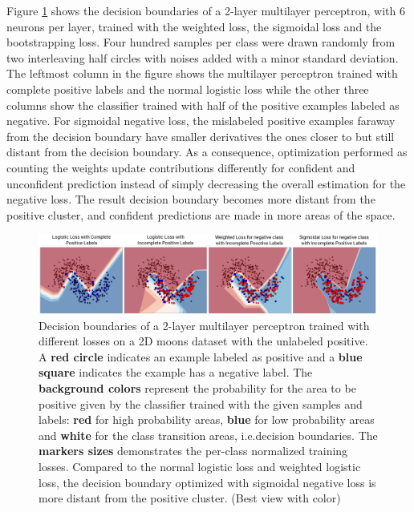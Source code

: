 Figure \ref{fig:moons} shows the decision boundaries of a 2-layer multilayer perceptron, with 6 neurons per layer, trained with the weighted loss, the sigmoidal loss and the bootstrapping loss.
Four hundred samples per class were drawn randomly from two interleaving half circles with noises added with a minor standard deviation.
The leftmost column in the figure shows the multilayer perceptron trained with complete positive labels and the normal logistic loss while the other three columns show the classifier trained with half of the positive examples labeled as negative.
For sigmoidal negative loss, the mislabeled positive examples faraway from the decision boundary have smaller derivatives the ones closer to but still distant from the decision boundary.
As a consequence, optimization performed as counting the weights update contributions differently for confident and unconfident prediction instead of simply decreasing the overall estimation for the negative loss.
The result decision boundary becomes more distant from the positive cluster, and confident predictions are made in more areas of the space.


\begin{figure}
\begin{center}
   \includegraphics[width=0.95\linewidth]{img/moons}
\end{center}
   \caption{
   Decision boundaries of a 2-layer multilayer perceptron trained with different losses on a 2D moons dataset with the unlabeled positive.
   A \textbf{red circle} indicates an example labeled as positive and a \textbf{blue square} indicates the example has a negative label.
   The \textbf{background colors} represent the probability for the area to be positive given by the classifier trained with the given samples and labels: \textbf{red} for high probability areas, \textbf{blue} for low probability areas and \textbf{white} for the class transition areas, i.e.decision boundaries.
   The \textbf{markers sizes} demonstrates the per-class normalized training losses.
   Compared to the normal logistic loss and weighted logistic loss, the decision boundary optimized with sigmoidal negative loss is more distant from the positive cluster.
   (Best view with color)
   }
\label{fig:moons}
\end{figure}


